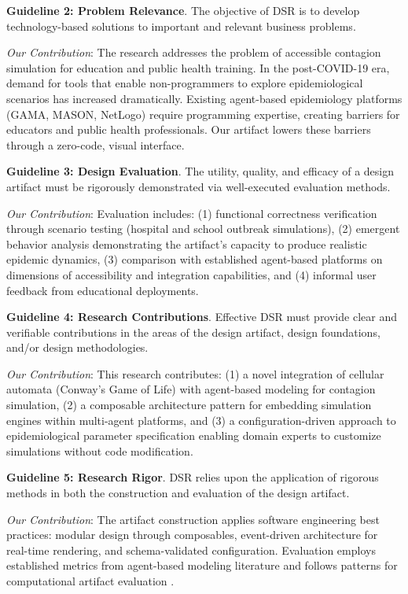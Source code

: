 \textbf{Guideline 2: Problem Relevance}. The objective of DSR is to develop technology-based solutions to important and relevant business problems.

\emph{Our Contribution}: The research addresses the problem of accessible contagion simulation for education and public health training. In the post-COVID-19 era, demand for tools that enable non-programmers to explore epidemiological scenarios has increased dramatically. Existing agent-based epidemiology platforms (GAMA, MASON, NetLogo) require programming expertise, creating barriers for educators and public health professionals. Our artifact lowers these barriers through a zero-code, visual interface.

\textbf{Guideline 3: Design Evaluation}. The utility, quality, and efficacy of a design artifact must be rigorously demonstrated via well-executed evaluation methods.

\emph{Our Contribution}: Evaluation includes: (1) functional correctness verification through scenario testing (hospital and school outbreak simulations), (2) emergent behavior analysis demonstrating the artifact's capacity to produce realistic epidemic dynamics, (3) comparison with established agent-based platforms on dimensions of accessibility and integration capabilities, and (4) informal user feedback from educational deployments.

\textbf{Guideline 4: Research Contributions}. Effective DSR must provide clear and verifiable contributions in the areas of the design artifact, design foundations, and/or design methodologies.

\emph{Our Contribution}: This research contributes: (1) a novel integration of cellular automata (Conway's Game of Life) with agent-based modeling for contagion simulation, (2) a composable architecture pattern for embedding simulation engines within multi-agent platforms, and (3) a configuration-driven approach to epidemiological parameter specification enabling domain experts to customize simulations without code modification.

\textbf{Guideline 5: Research Rigor}. DSR relies upon the application of rigorous methods in both the construction and evaluation of the design artifact.

\emph{Our Contribution}: The artifact construction applies software engineering best practices: modular design through composables, event-driven architecture for real-time rendering, and schema-validated configuration. Evaluation employs established metrics from agent-based modeling literature and follows patterns for computational artifact evaluation \cite{sonnenberg2012evaluation}.

